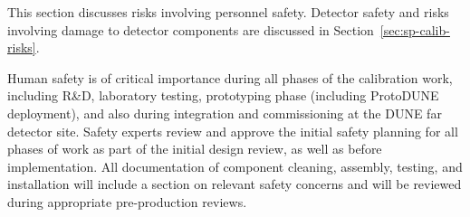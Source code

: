 

This section discusses risks involving personnel safety. Detector safety and risks involving damage to detector components are discussed in Section~\ref{sec:sp-calib-risks}.

Human safety is of critical importance during all phases of the calibration work, including R\&D, laboratory testing, prototyping phase (including ProtoDUNE deployment), and also during integration and commissioning at the DUNE far detector site. Safety experts review and approve the initial safety planning for all phases of work as part of the initial design review, as well as before implementation. All documentation of component cleaning, assembly, testing, and installation will include a section on relevant safety concerns and will be reviewed during appropriate pre-production reviews.

